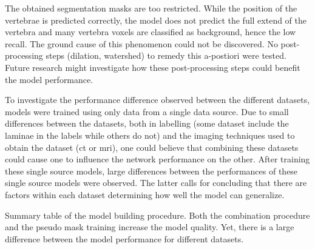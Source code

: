 \par{
    The obtained segmentation masks are too restricted.
    While the position of the vertebrae is predicted correctly, the model does not predict the full extend of the vertebra and many vertebra voxels are classified as background, hence the low recall.
    The ground cause of this phenomenon could not be discovered.
    No post-processing steps (dilation, watershed) to remedy this a-postiori were tested.
    Future research might investigate how these post-processing steps could benefit the model performance. 
}

\par{
    To investigate the performance difference observed between the different datasets, models were trained using only data from a single data source.
    Due to small differences between the datasets, both in labelling (some dataset include the laminae in the labels while others do not) and the imaging techniques used to obtain the dataset (\acrshort{ct} or \acrshort{mri}),
    one could believe that combining these datasets could cause one to influence the network performance on the other.
    After training these single source models, large differences between the performances of these single source models were observed.
    The latter calls for concluding that there are factors within each dataset determining how well the model can generalize.
}

\begin{table}

    
    \caption{Summary table of the model building procedure. Both the combination procedure and the pseudo mask training increase the model quality. 
    Yet, there is a large difference between the model performance for different datasets.
    }

\end{table}

